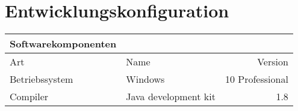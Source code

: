 \section{Entwicklungskonfiguration}
\begin{table}[h!]
	\begin{tabular}{llr} 
	\toprule
	Softwarekomponenten\\  
	\midrule 
	Art & Name & Version\\ 
	\midrule 
	Betriebssystem & Windows & 10 Professional\\ 
	Compiler & Java development kit & 1.8\\
	\bottomrule
	\end{tabular}
	\label{tab:ablaufbedingungen}
\end{table}
